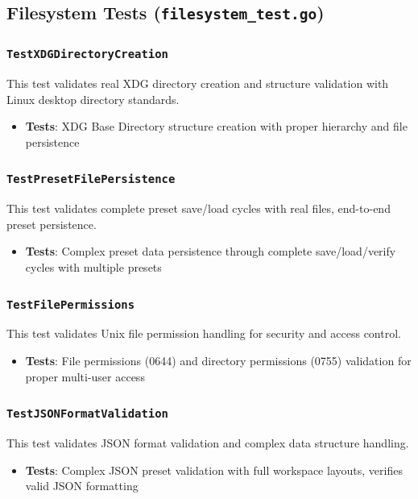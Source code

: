 \subsection{Filesystem Tests (\texttt{filesystem\_test.go})}

\subsubsection*{\texttt{TestXDGDirectoryCreation}}
This test validates real XDG directory creation and structure validation with Linux desktop directory standards.
\begin{itemize}
    \item \textbf{Tests}: XDG Base Directory structure creation with proper hierarchy and file persistence
\end{itemize}

\subsubsection*{\texttt{TestPresetFilePersistence}}
This test validates complete preset save/load cycles with real files, end-to-end preset persistence.
\begin{itemize}
    \item \textbf{Tests}: Complex preset data persistence through complete save/load/verify cycles with multiple presets
\end{itemize}

\subsubsection*{\texttt{TestFilePermissions}}
This test validates Unix file permission handling for security and access control.
\begin{itemize}
    \item \textbf{Tests}: File permissions (0644) and directory permissions (0755) validation for proper multi-user access
\end{itemize}

\subsubsection*{\texttt{TestJSONFormatValidation}}
This test validates JSON format validation and complex data structure handling.
\begin{itemize}
    \item \textbf{Tests}: Complex JSON preset validation with full workspace layouts, verifies valid JSON formatting
\end{itemize}

